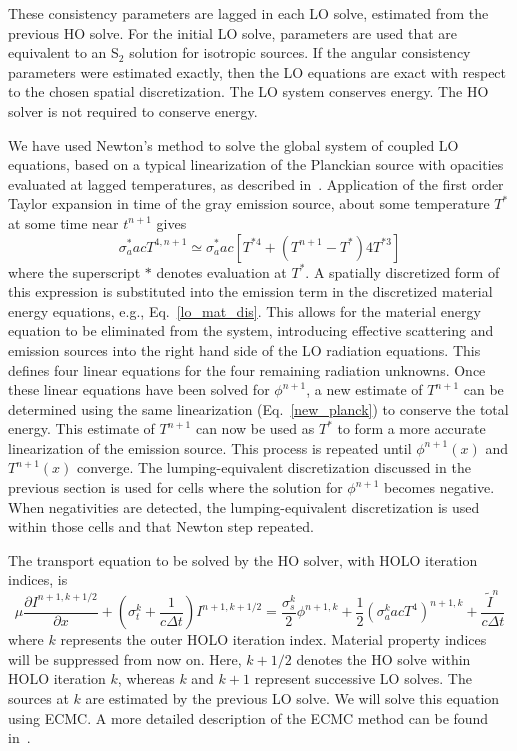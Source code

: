\documentclass{mc2013}
\newcommand{\pderiv}[2]{\frac{\partial #1}{\partial #2}}
\begin{document}
 These consistency parameters are lagged in each LO solve,
estimated from the previous HO solve. For the initial LO solve, parameters are used
that are equivalent to an S$_2$ solution for isotropic sources.
If the angular consistency parameters were estimated exactly, then the LO equations are exact with respect to the chosen
spatial discretization. The LO system conserves energy. The HO solver is not required
to conserve energy.


We have used Newton's method to solve the global system of coupled LO
equations, based on a typical linearization of the Planckian source with opacities
evaluated at lagged temperatures, as described in~\cite{morel_newton}.  Application of the first order Taylor expansion in time of the
gray emission source, about some temperature $T^*$ at some
time near $t^{n+1}$ gives
\begin{equation}\label{new_planck}
    \sigma_a^* a c T^{4,n+1} \simeq \sigma_a^* a c \left[T^{*4} + (T^{n+1} - T^*) 4T^{*3} \right]
\end{equation}
where the superscript $*$ denotes evaluation at $T^*$. A spatially discretized form
of this expression is substituted
into the emission term in the discretized material
energy equations, e.g., Eq.~\eqref{lo_mat_dis}.  This allows for the material energy
equation to be eliminated from the system, introducing effective scattering and
emission sources into the right hand side
of the LO radiation equations. This defines four linear equations for the four remaining radiation unknowns. 
Once these linear equations have been solved for $\phi^{n+1}$, a new estimate of
$T^{n+1}$ can be determined using the same linearization (Eq.~\eqref{new_planck}) to
conserve the total energy.  This estimate of $T^{n+1}$ can now be used as $T^*$ to form a more
accurate linearization of the emission source.  This process is repeated until
$\phi^{n+1}(x)$ and $T^{n+1}(x)$ converge.  The lumping-equivalent discretization
discussed in the previous section is used for cells where the solution for
$\phi^{n+1}$ becomes negative. When negativities are detected, the lumping-equivalent discretization is used within
those cells and that  Newton step repeated.  


The transport equation to be solved by the HO solver, with HOLO iteration indices, is
\begin{equation}
\mu \pderiv{I^{n+1,k+1/2}}{x} + \left(\sigma_t^k + \frac{1}{c \Delta t }\right)
I^{n+1,k+1/2}
= \frac{\sigma_s^k}{2} \phi^{n+1,k} +\frac{1}{2} \left(\sigma_a^k a c T^4
\right)^{n+1,k} + \frac{\tilde I^n}{c\Delta t} 
\end{equation}
where $k$ represents the outer HOLO iteration index.  Material property indices will be
suppressed from now on.  Here, $k+1/2$ denotes the
HO solve within HOLO iteration $k$, whereas $k$ and $k+1$ represent successive LO
solves. The sources at $k$ are estimated by the previous LO solve.  We will solve
this equation using ECMC.  A more detailed description of the
ECMC method can be found in~\cite{jake_thesis}. 
\end{document}
